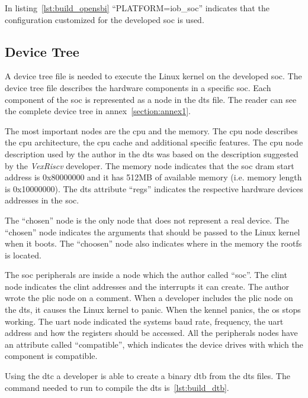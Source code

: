 In listing~\ref{lst:build_opensbi} \enquote{PLATFORM=iob\_soc} indicates that the configuration customized for the developed \acrshort{soc} is used.

\subsection{Device Tree}
A device tree file is needed to execute the Linux kernel on the developed \acrshort{soc}. The device tree file describes the hardware components in a specific \acrshort{soc}. Each component of the \acrshort{soc} is represented as a node in the \acrfull{dts} file. The reader can see the complete device tree in annex~\ref{section:annex1}.

The most important nodes are the \acrshort{cpu} and the memory. The \acrshort{cpu} node describes the \acrshort{cpu} architecture, the \acrshort{cpu} cache and additional specific features. The \acrshort{cpu} node description used by the author in the \acrfull{dts} was based on the description suggested by the \textit{VexRiscv} developer. The memory node indicates that the \acrshort{soc} \acrshort{dram} start address is 0x80000000 and it has 512MB of available memory (i.e. memory length is 0x10000000). The \acrshort{dts} attribute \enquote{regs} indicates the respective hardware devices addresses in the \acrshort{soc}.

The \enquote{chosen} node is the only node that does not represent a real device. The \enquote{chosen} node indicates the arguments that should be passed to the Linux kernel when it boots. The \enquote{choosen} node also indicates where in the memory the \acrlong{rootfs} is located.

The \acrshort{soc} peripherals are inside a node which the author called \enquote{soc}. The \acrshort{clint} node indicates the  \acrshort{clint} addresses and the interrupts it can create. The author wrote the \acrshort{plic} node on a comment. When a developer includes the \acrshort{plic} node on the \acrshort{dts}, it causes the Linux kernel to panic. When the kennel panics, the \acrshort{os} stops working. The \acrshort{uart} node indicated the systems baud rate, frequency, the \acrshort{uart} address and how the registers should be accessed. All the peripherals nodes have an attribute called \enquote{compatible}, which indicates the device drives with which the component is compatible.

Using the \acrfull{dtc} a developer is able to create a binary \acrfull{dtb} from the \acrfull{dts} files. The command needed to run to compile the \acrshort{dts} is~\ref{lst:build_dtb}.

